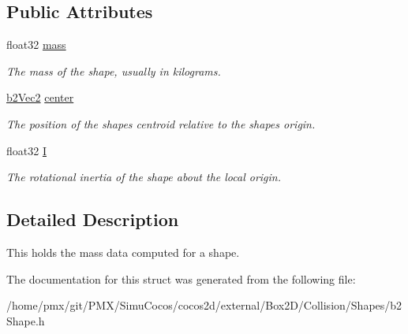\subsection*{Public Attributes}
\begin{DoxyCompactItemize}
\item 
\mbox{\label{structb2MassData_aea85d9595a38d2eed05b8d2ea80d97b1}} 
float32 \hyperlink{structb2MassData_aea85d9595a38d2eed05b8d2ea80d97b1}{mass}
\begin{DoxyCompactList}\small\item\em The mass of the shape, usually in kilograms. \end{DoxyCompactList}\item 
\mbox{\label{structb2MassData_a1d59bebc7030c4dded0c2febc57ebdd7}} 
\hyperlink{structb2Vec2}{b2\+Vec2} \hyperlink{structb2MassData_a1d59bebc7030c4dded0c2febc57ebdd7}{center}
\begin{DoxyCompactList}\small\item\em The position of the shape\textquotesingle{}s centroid relative to the shape\textquotesingle{}s origin. \end{DoxyCompactList}\item 
\mbox{\label{structb2MassData_ad2d06e96e2d79d895df16ae0e5fe0376}} 
float32 \hyperlink{structb2MassData_ad2d06e96e2d79d895df16ae0e5fe0376}{I}
\begin{DoxyCompactList}\small\item\em The rotational inertia of the shape about the local origin. \end{DoxyCompactList}\end{DoxyCompactItemize}


\subsection{Detailed Description}
This holds the mass data computed for a shape. 

The documentation for this struct was generated from the following file\+:\begin{DoxyCompactItemize}
\item 
/home/pmx/git/\+P\+M\+X/\+Simu\+Cocos/cocos2d/external/\+Box2\+D/\+Collision/\+Shapes/b2\+Shape.\+h\end{DoxyCompactItemize}
